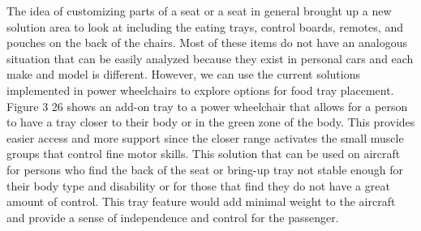 The idea of customizing parts of a seat or a seat in general brought up a new solution area to look at including the eating trays, control boards, remotes, and pouches on the back of the chairs. Most of these items do not have an analogous situation that can be easily analyzed because they exist in personal cars and each make and model is different. However, we can use the current solutions implemented in power wheelchairs to explore options for food tray placement.  Figure 3 26 shows an add-on tray to a power wheelchair that allows for a person to have a tray closer to their body or in the green zone of the body.  This provides easier access and more support since the closer range activates the small muscle groups that control fine motor skills.  This solution that can be used on aircraft for persons who find the back of the seat or bring-up tray not stable enough for their body type and disability or for those that find they do not have a great amount of control.  This tray feature would add minimal weight to the aircraft and provide a sense of independence and control for the passenger.